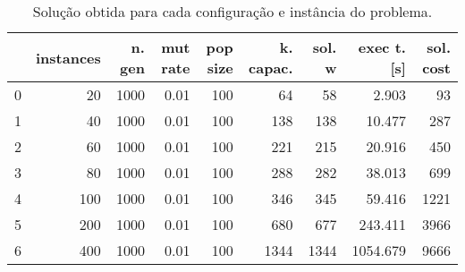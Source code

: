 \documentclass{article}
\begin{document}
\begin{table}
\centering
\begin{tabular}{lrrrrrrrr}
\toprule
{} &  instances &  n. gen &  mut rate &  pop size &  k. capac. &  sol. w &  exec t. [s] &  sol. cost \\
\midrule
0 &         20 &    1000 &      0.01 &       100 &         64 &      58 &        2.903 &         93 \\
1 &         40 &    1000 &      0.01 &       100 &        138 &     138 &       10.477 &        287 \\
2 &         60 &    1000 &      0.01 &       100 &        221 &     215 &       20.916 &        450 \\
3 &         80 &    1000 &      0.01 &       100 &        288 &     282 &       38.013 &        699 \\
4 &        100 &    1000 &      0.01 &       100 &        346 &     345 &       59.416 &       1221 \\
5 &        200 &    1000 &      0.01 &       100 &        680 &     677 &      243.411 &       3966 \\
6 &        400 &    1000 &      0.01 &       100 &       1344 &    1344 &     1054.679 &       9666 \\
\bottomrule
\end{tabular}
\caption{Solução obtida para cada configuração e instância do problema.}
\label{table:all-data}
\end{table}
\end{document}

